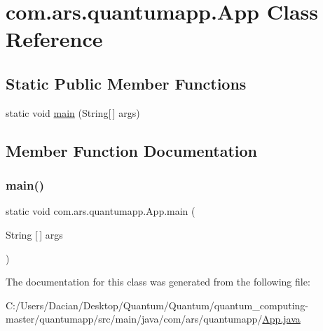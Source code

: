\hypertarget{classcom_1_1ars_1_1quantumapp_1_1_app}{}\section{com.\+ars.\+quantumapp.\+App Class Reference}
\label{classcom_1_1ars_1_1quantumapp_1_1_app}
\subsection*{Static Public Member Functions}
\begin{DoxyCompactItemize}
\item 
static void \hyperlink{classcom_1_1ars_1_1quantumapp_1_1_app_a947b9f49b899470769697e6bd4b83943}{main} (String\mbox{[}$\,$\mbox{]} args)
\end{DoxyCompactItemize}


\subsection{Member Function Documentation}
\hypertarget{classcom_1_1ars_1_1quantumapp_1_1_app_a947b9f49b899470769697e6bd4b83943}{}\label{classcom_1_1ars_1_1quantumapp_1_1_app_a947b9f49b899470769697e6bd4b83943} 
\subsubsection{\texorpdfstring{main()}{main()}}
{\footnotesize\ttfamily static void com.\+ars.\+quantumapp.\+App.\+main (\begin{DoxyParamCaption}\item[{String \mbox{[}$\,$\mbox{]}}]{args }\end{DoxyParamCaption})\hspace{0.3cm}{\ttfamily [static]}}



The documentation for this class was generated from the following file\+:\begin{DoxyCompactItemize}
\item 
C\+:/\+Users/\+Dacian/\+Desktop/\+Quantum/\+Quantum/quantum\+\_\+computing-\/master/quantumapp/src/main/java/com/ars/quantumapp/\hyperlink{_app_8java}{App.\+java}\end{DoxyCompactItemize}
